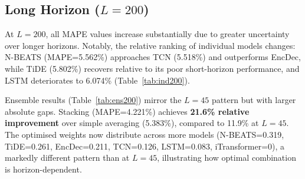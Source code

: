 \documentclass[conference]{IEEEtran}
\begin{document}
\subsection{Long Horizon ($L=200$)}

At $L=200$, all MAPE values increase substantially due to greater uncertainty
over longer horizons. Notably, the relative ranking of individual models
changes: N-BEATS (MAPE=5.562\%) approaches TCN (5.518\%) and outperforms
EncDec, while TiDE (5.802\%) recovers relative to its poor short-horizon
performance, and LSTM deteriorates to 6.074\% (Table~\ref{tab:ind200}).

\begin{table}[t]
  \caption{Individual models, $L=200$, held-out.}
  \label{tab:ind200}
  \centering
\end{table}

Ensemble results (Table~\ref{tab:ens200}) mirror the $L=45$ pattern but with
larger absolute gaps. Stacking (MAPE=4.221\%) achieves \textbf{21.6\% relative
improvement} over simple averaging (5.383\%), compared to 11.9\% at $L=45$.
The optimised weights now distribute across more models (N-BEATS=0.319,
TiDE=0.261, EncDec=0.211, TCN=0.126, LSTM=0.083, iTransformer=0), a markedly
different pattern than at $L=45$, illustrating how optimal combination is
horizon-dependent.
\end{document}
